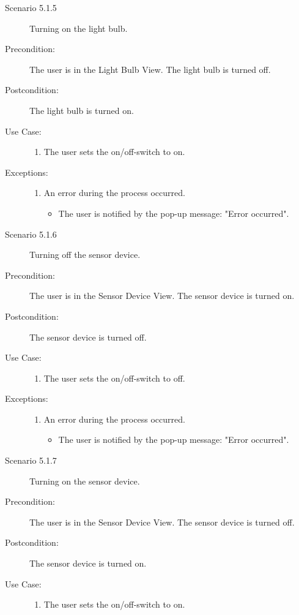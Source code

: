 \documentclass[a4paper]{article}
\begin{document}
\begin{description}
\item[]
\item[Scenario 5.1.5] Turning on the light bulb.
\item[Precondition:] The user is in the Light Bulb View. The light bulb is turned off.
\item[Postcondition:] The light bulb is turned on.
\item[Use Case:]\mbox{}
\begin{enumerate}
\item  The user sets the on/off-switch to on.
\end{enumerate}

\item[Exceptions:]
\item[]
\begin{enumerate}
\item An error during the process occurred.
\begin{itemize}
\item The user is notified by the pop-up message: "Error occurred".
\end{itemize}
\end{enumerate}

\item[]

\item[Scenario 5.1.6] Turning off the sensor device.
\item[Precondition:] The user is in the Sensor Device View. The sensor device is turned on.
\item[Postcondition:] The sensor device is turned off.
\item[Use Case:]\mbox{}
\begin{enumerate}
\item  The user sets the on/off-switch to off.
\end{enumerate}

\item[Exceptions:]
\item[]
\begin{enumerate}
\item An error during the process occurred.
\begin{itemize}
\item The user is notified by the pop-up message: "Error occurred".
\end{itemize}
\end{enumerate}

\item[]

\item[Scenario 5.1.7] Turning on the sensor device.
\item[Precondition:] The user is in the Sensor Device View. The sensor device is turned off.
\item[Postcondition:] The sensor device is turned on.
\item[Use Case:]\mbox{}
\begin{enumerate}
\item  The user sets the on/off-switch to on.
\end{enumerate}


\end{description}
\end{document}
